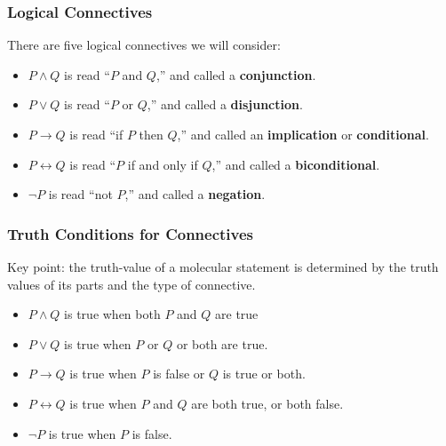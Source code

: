 \documentclass[11pt, compress]{beamer}
\newcommand{\terminology}[1]{\textbf{#1}}\newcommand{\lt}{<}
\renewcommand{\iff}{\leftrightarrow}
\newcommand{\imp}{\rightarrow}
\begin{document}
\begin{frame}
\frametitle{Logical Connectives}
 There are five logical connectives we will consider:
\pause 

\begin{itemize}[<+->]
\item{} \(P \wedge Q\) is read ``\(P\) and \(Q\),'' and called a \terminology{conjunction}.

\item{} \(P \vee Q\) is read ``\(P\) or \(Q\),'' and called a \terminology{disjunction}.

\item{} \(P \imp Q\) is read ``if \(P\) then \(Q\),'' and called an \terminology{implication} or \terminology{conditional}.

\item{} \(P \iff Q\) is read ``\(P\) if and only if \(Q\),'' and called a \terminology{biconditional}.

\item{} \(\neg P\) is read ``not \(P\),'' and called a \terminology{negation}.
\end{itemize}

\end{frame}
 
\begin{frame}
\frametitle{Truth Conditions for Connectives}
 Key point: the truth-value of a molecular statement is determined by the truth values of its parts and the type of connective.
\pause 

\begin{itemize}[<+->]
\item{} \(P \wedge Q\) is true when both \(P\) and \(Q\) are true

\item{} \(P \vee Q\) is true when \(P\) or \(Q\) or both are true.

\item{} \(P \imp Q\) is true when \(P\) is false or \(Q\) is true or both.

\item{} \(P \iff Q\) is true when \(P\) and \(Q\) are both true, or both false.

\item{} \(\neg P\) is true when \(P\) is false.
\end{itemize}

\end{frame}
 
\end{document}
